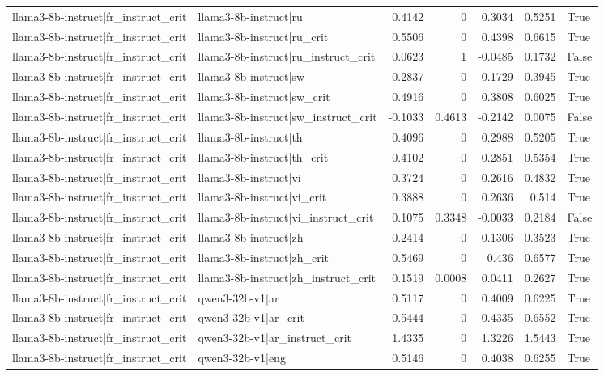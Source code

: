 \begin{table}
\begin{tabular}{l l r r r r l}
llama3-8b-instruct|fr_instruct_crit & llama3-8b-instruct|ru & 0.4142 & 0 & 0.3034 & 0.5251 & True \\
llama3-8b-instruct|fr_instruct_crit & llama3-8b-instruct|ru_crit & 0.5506 & 0 & 0.4398 & 0.6615 & True \\
llama3-8b-instruct|fr_instruct_crit & llama3-8b-instruct|ru_instruct_crit & 0.0623 & 1 & -0.0485 & 0.1732 & False \\
llama3-8b-instruct|fr_instruct_crit & llama3-8b-instruct|sw & 0.2837 & 0 & 0.1729 & 0.3945 & True \\
llama3-8b-instruct|fr_instruct_crit & llama3-8b-instruct|sw_crit & 0.4916 & 0 & 0.3808 & 0.6025 & True \\
llama3-8b-instruct|fr_instruct_crit & llama3-8b-instruct|sw_instruct_crit & -0.1033 & 0.4613 & -0.2142 & 0.0075 & False \\
llama3-8b-instruct|fr_instruct_crit & llama3-8b-instruct|th & 0.4096 & 0 & 0.2988 & 0.5205 & True \\
llama3-8b-instruct|fr_instruct_crit & llama3-8b-instruct|th_crit & 0.4102 & 0 & 0.2851 & 0.5354 & True \\
llama3-8b-instruct|fr_instruct_crit & llama3-8b-instruct|vi & 0.3724 & 0 & 0.2616 & 0.4832 & True \\
llama3-8b-instruct|fr_instruct_crit & llama3-8b-instruct|vi_crit & 0.3888 & 0 & 0.2636 & 0.514 & True \\
llama3-8b-instruct|fr_instruct_crit & llama3-8b-instruct|vi_instruct_crit & 0.1075 & 0.3348 & -0.0033 & 0.2184 & False \\
llama3-8b-instruct|fr_instruct_crit & llama3-8b-instruct|zh & 0.2414 & 0 & 0.1306 & 0.3523 & True \\
llama3-8b-instruct|fr_instruct_crit & llama3-8b-instruct|zh_crit & 0.5469 & 0 & 0.436 & 0.6577 & True \\
llama3-8b-instruct|fr_instruct_crit & llama3-8b-instruct|zh_instruct_crit & 0.1519 & 0.0008 & 0.0411 & 0.2627 & True \\
llama3-8b-instruct|fr_instruct_crit & qwen3-32b-v1|ar & 0.5117 & 0 & 0.4009 & 0.6225 & True \\
llama3-8b-instruct|fr_instruct_crit & qwen3-32b-v1|ar_crit & 0.5444 & 0 & 0.4335 & 0.6552 & True \\
llama3-8b-instruct|fr_instruct_crit & qwen3-32b-v1|ar_instruct_crit & 1.4335 & 0 & 1.3226 & 1.5443 & True \\
llama3-8b-instruct|fr_instruct_crit & qwen3-32b-v1|eng & 0.5146 & 0 & 0.4038 & 0.6255 & True \\

\end{tabular}
\end{table}

